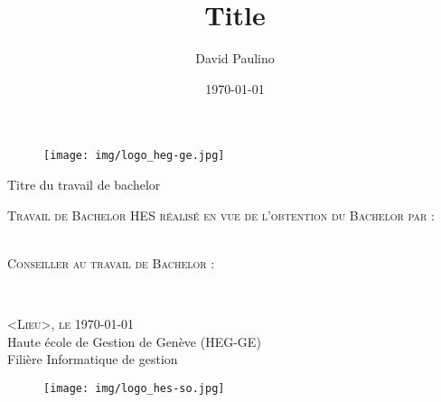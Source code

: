 \documentclass[12pt]{article}
\title{Title}
\author{David Paulino}
\date{\today}
\begin{document}
\begin{titlepage}

    \begin{figure}[h]
        \texttt{[image: img/logo\_heg-ge.jpg]}
    \end{figure}

    \vspace*{0.5cm}

    \begin{center}

        \begingroup \linespread{1,75} \selectfont
        {\Large Titre du travail de bachelor}\\[0,75cm]
        \endgroup



        \vspace{1.5cm}

        \textsc{\large Travail de Bachelor HES réalisé en vue de \newline l’obtention du Bachelor par :}\\[0,50cm]

        \begingroup \linespread{1,75} \selectfont
        \textsc{}\\[0,50cm]
        \endgroup


        \vspace{1cm}


        \textsc{\large Conseiller au travail de Bachelor : }

        \begingroup \linespread{1,75} \selectfont
        \textsc{}\\[1cm]
        \endgroup


        \begingroup \linespread{1,75} \selectfont
        \textsc{\large <Lieu>, le \today}\\[0,25cm]

        {\large Haute école de Gestion de Genève (HEG-GE)}\\[0,25cm]

        {\large Filière Informatique de gestion}\\[0,25cm]
        \endgroup



        \begin{figure}[h]
            \vspace*{1cm}
            \hspace*{12cm}\texttt{[image: img/logo\_hes-so.jpg]}
        \end{figure}

    \end{center}



    \vfill
\end{titlepage}
\end{document}
